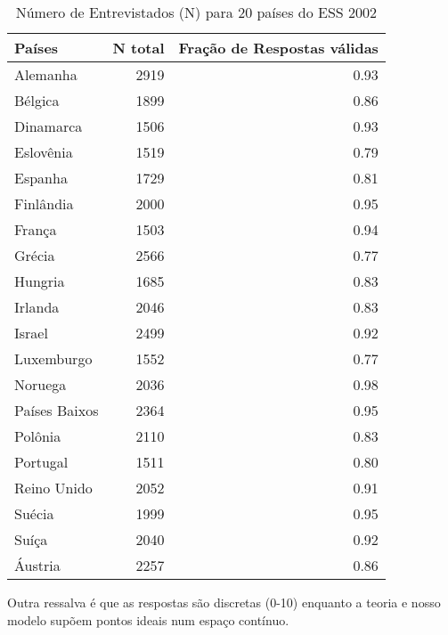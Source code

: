 \begin{table}[h]
  \centering
\label{my-label}
\begin{tabular}{|l|r|r|}
\hline
\textbf{Países} & \textbf{N total} & \textbf{Fração  de Respostas  válidas} \\ \hline
Alemanha        & 2919             & 0.93                           \\ \hline
Bélgica         & 1899             & 0.86                           \\ \hline
Dinamarca       & 1506             & 0.93                           \\ \hline
Eslovênia       & 1519             & 0.79                           \\ \hline
Espanha         & 1729             & 0.81                           \\ \hline
Finlândia       & 2000             & 0.95                           \\ \hline
França          & 1503             & 0.94                           \\ \hline
Grécia          & 2566             & 0.77                           \\ \hline
Hungria         & 1685             & 0.83                           \\ \hline
Irlanda         & 2046             & 0.83                           \\ \hline
Israel          & 2499             & 0.92                           \\ \hline
Luxemburgo      & 1552             & 0.77                           \\ \hline
Noruega         & 2036             & 0.98                           \\ \hline
Países Baixos   & 2364             & 0.95                           \\ \hline
Polônia         & 2110             & 0.83                           \\ \hline
Portugal        & 1511             & 0.80                           \\ \hline
Reino Unido     & 2052             & 0.91                           \\ \hline
Suécia          & 1999             & 0.95                           \\ \hline
Suíça           & 2040             & 0.92                           \\ \hline
Áustria         & 2257             & 0.86                           \\ \hline
\end{tabular}
\caption{Número de Entrevistados (N) para 20 países do ESS 2002}
\end{table}


Outra ressalva é que as respostas são discretas (0-10) enquanto a teoria e nosso
modelo supõem pontos ideais num espaço contínuo.

